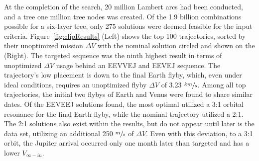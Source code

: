 \documentclass[letterpaper, preprint, paper,11pt]{AAS}	%
\begin{document}
At the completion of the search, 20 million Lambert arcs had been conducted, and a tree one million tree nodes was created. Of the 1.9 billion combinations possible for a six-layer tree, only 275 solutions were deemed feasible for the input criteria. Figure~\ref*{fig:clipResults} (Left) shows the top 100 trajectories, sorted by their unoptimized mission $\Delta V$ with the nominal solution circled and shown on the (Right). The targeted sequence was the ninth highest result in terms of unoptimized $\Delta V$ usage behind an EEVVEJ and EEVEJ sequence. The trajectory's low placement is down to the final Earth flyby, which, even under ideal conditions, requires an unoptimized flyby $\Delta V$ of 3.23 $\sfrac{km}{s}$. Among all top trajectories, the initial two flybys of Earth and Venus were found to share similar dates. Of the EEVEEJ solutions found, the most optimal utilized a 3:1 orbital resonance for the final Earth flyby, while the nominal trajectory utilized a 2:1. The 2:1 solutions also exist within the results, but do not appear until later is the data set, utilizing an additional 250 $\sfrac{m}{s}$ of $\Delta V$. Even with this deviation, to a 3:1 orbit, the Jupiter arrival occurred only one month later than targeted and has a lower $V_{\infty-in}$.
\end{document}
